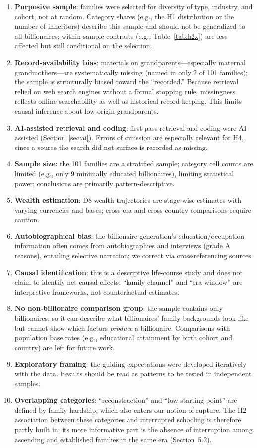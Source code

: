\documentclass[11pt,a4paper]{article}
\begin{document}
\begin{enumerate}
\item \textbf{Purposive sample}: families were selected for diversity of type, industry, and cohort, not at random. Category shares (e.g., the H1 distribution or the number of inheritors) describe this sample and should not be generalized to all billionaires; within-sample contrasts (e.g., Table~\ref{tab:h2x}) are less affected but still conditional on the selection.
\item \textbf{Record-availability bias}: materials on grandparents---especially maternal grandmothers---are systematically missing (named in only 2 of 101 families); the sample is structurally biased toward the ``recorded.'' Because retrieval relied on web search engines without a formal stopping rule, missingness reflects online searchability as well as historical record-keeping. This limits causal inference about low-origin grandparents.
\item \textbf{AI-assisted retrieval and coding}: first-pass retrieval and coding were AI-assisted (Section~\ref{sec:ai}). Errors of omission are especially relevant for H4, since a source the search did not surface is recorded as missing.
\item \textbf{Sample size}: the 101 families are a stratified sample; category cell counts are limited (e.g., only 9 minimally educated billionaires), limiting statistical power; conclusions are primarily pattern-descriptive.
\item \textbf{Wealth estimation}: D8 wealth trajectories are stage-wise estimates with varying currencies and bases; cross-era and cross-country comparisons require caution.
\item \textbf{Autobiographical bias}: the billionaire generation's education/occupation information often comes from autobiographies and interviews (grade A reasons), entailing selective narration; we correct via cross-referencing sources.
\item \textbf{Causal identification}: this is a descriptive life-course study and does not claim to identify net causal effects; ``family channel'' and ``era window'' are interpretive frameworks, not counterfactual estimates.
\item \textbf{No non-billionaire comparison group}: the sample contains only billionaires, so it can describe what billionaires' family backgrounds look like but cannot show which factors \emph{produce} a billionaire. Comparisons with population base rates (e.g., educational attainment by birth cohort and country) are left for future work.
\item \textbf{Exploratory framing}: the guiding expectations were developed iteratively with the data. Results should be read as patterns to be tested in independent samples.
\item \textbf{Overlapping categories}: ``reconstruction'' and ``low starting point'' are defined by family hardship, which also enters our notion of rupture. The H2 association between these categories and interrupted schooling is therefore partly built in; its more informative part is the absence of interruption among ascending and established families in the same era (Section~5.2).
\end{enumerate}
\end{document}
